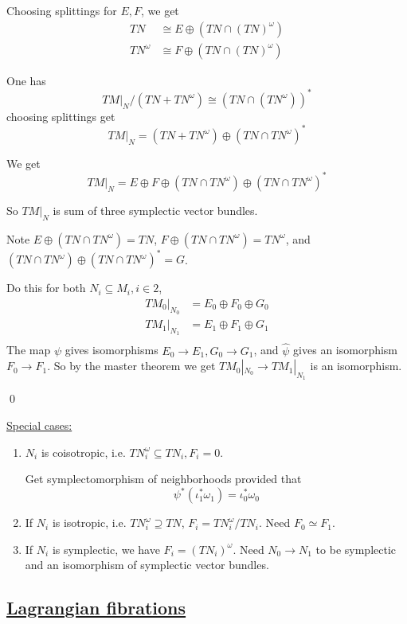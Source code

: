 \documentclass[x11names,reqno,14pt]{extarticle}
\begin{document}
Choosing splittings for $E, F$, we get 
\begin{align*}
TN & \cong E\oplus(TN\cap (TN)^\omega) \\
TN^\omega & \cong F\oplus(TN\cap(TN)^\omega)
\end{align*}

One has 
\[
TM|_N /(TN + TN^\omega) \cong (TN\cap(TN^\omega))^*
\]
choosing splittings get
\[
TM|_N = (TN + TN^\omega)\oplus(TN\cap TN^\omega)^*
\]

We get 
\[
TM|_N = E\oplus F \oplus (TN\cap TN^\omega)\oplus(TN\cap TN^\omega)^*
\]

So $TM|_N$ is sum of three symplectic vector bundles.

Note $E\oplus (TN\cap TN^\omega) = TN$, $F\oplus(TN\cap TN^\omega) = TN^\omega$, and $(TN\cap TN^\omega)\oplus(TN\cap TN^\omega)^* = G$. 

Do this for both $N_i \subseteq M_i, i \in 2$, 
\begin{align*}
TM_0|_{N_0} & = E_0\oplus F_0\oplus G_0 \\
TM_1|_{N_1} & = E_1\oplus F_1\oplus G_1 \\
\end{align*}
The map $\psi$ gives isomorphisms $E_0\to E_1, G_0\to G_1$, and $\hat{\psi}$ gives an isomorphism $F_0\to F_1$. So by the master theorem we get $TM_0|_{N_0} \to TM_1|_{N_1}$ is an isomorphism. 

\qed

\underline{Special cases:}\,
\begin{enumerate}

\item $N_i$ is coisotropic, i.e. $TN_i^\omega\subseteq TN_i, F_i = 0$. 

Get symplectomorphism of neighborhoods provided that 
\[
\psi^*(\iota_1^*\omega_1) = \iota_0^*\omega_0
\]

\item If $N_i$ is isotropic, i.e. $TN_i^\omega\supseteq TN$, $F_i = TN_i^\omega/TN_i$. Need $F_0 \simeq F_1$. 

\item If $N_i$ is symplectic, we have $F_i = (TN_i)^\omega$. Need $N_0\to N_1$ to be symplectic and an isomorphism of symplectic vector bundles.

\end{enumerate}


\subsection*{\underline{Lagrangian fibrations}}
\end{document}
